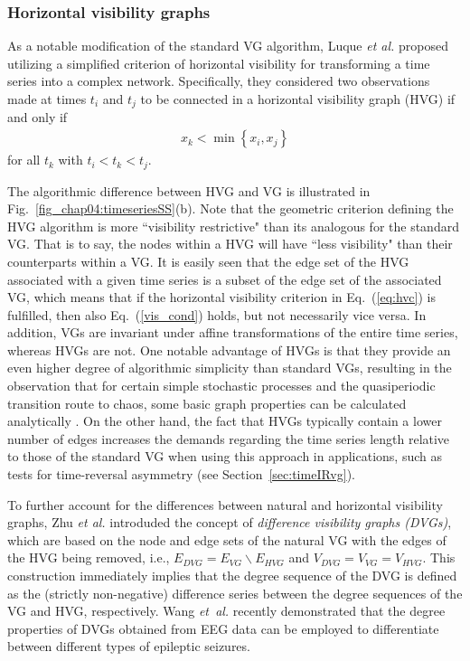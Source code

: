 		\subsubsection{Horizontal visibility graphs}
		As a notable modification of the standard VG algorithm, Luque \textit{et al.} \cite{Luque2009,Lacasa2010} proposed utilizing a simplified criterion of horizontal visibility for transforming a time series into a complex network. Specifically, they considered two observations made at times $t_i$ and $t_j$ to be connected in a horizontal visibility graph (HVG) if and only if
\begin{align}
x_k < \min \left\{ x_i, x_j \right\} \label{eq:hvc}
\end{align}
for all $t_k$ with $t_i<t_k<t_j$. 

		The algorithmic difference between HVG and VG is illustrated in Fig.~\ref{fig_chap04:timeseriesSS}(b). Note that the geometric criterion defining the HVG algorithm is more ``visibility restrictive" than its analogous for the standard VG. That is to say, the nodes within a HVG will have ``less visibility" than their counterparts within a VG. It is easily seen that the edge set of the HVG associated with a given time series is a subset of the edge set of the associated VG, which means that if the horizontal visibility criterion in Eq.~(\ref{eq:hvc}) is fulfilled, then also Eq.~(\ref{vis_cond}) holds, but not necessarily vice versa. In addition, VGs are invariant under affine transformations of the entire time series, whereas HVGs are not. One notable advantage of HVGs is that they provide an even higher degree of algorithmic simplicity than standard VGs, resulting in the observation that for certain simple stochastic processes and the quasiperiodic transition route to chaos, some basic graph properties can be calculated analytically \citep{Luque2009,Luque2013a,Luque2013d}. On the other hand, the fact that HVGs typically contain a lower number of edges increases the demands regarding the time series length relative to those of the standard VG when using this approach in applications, such as tests for time-reversal asymmetry \citep{Donges2013} (see Section~\ref{sec:timeIRvg}). 
		
        To further account for the differences between natural and horizontal visibility graphs, Zhu \textit{et al.} \cite{Zhu2014b} introduded the concept of \emph{difference visibility graphs (DVGs)}, which are based on the node and edge sets of the natural VG with the edges of the HVG being removed, i.e., $E_{DVG}=E_{VG}\backslash E_{HVG}$ and $V_{DVG}=V_{VG}=V_{HVG}$. This construction immediately implies that the degree sequence of the DVG is defined as the (strictly non-negative) difference series between the degree sequences of the VG and HVG, respectively. Wang \textit{et~al.} \cite{Wang2017} recently demonstrated that the degree properties of DVGs obtained from EEG data can be employed to differentiate between different types of epileptic seizures.
        
